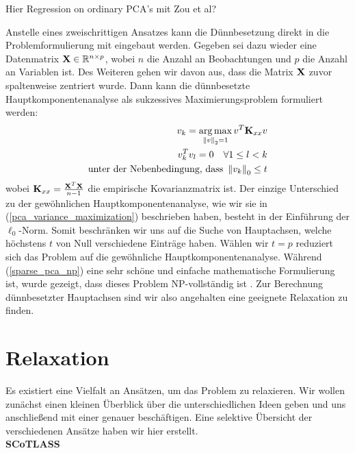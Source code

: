 Hier Regression on ordinary PCA's mit Zou et al?

Anstelle eines zweischrittigen Ansatzes kann die Dünnbesetzung direkt in die Problemformulierung mit eingebaut werden. Gegeben sei dazu wieder eine Datenmatrix $\mathbf{X} \in \mathbb{R}^{n \times p}$, wobei $n$ die Anzahl an Beobachtungen und $p$ die Anzahl an Variablen ist. Des Weiteren gehen wir davon aus, dass die Matrix $\mathbf{X}$ zuvor spaltenweise zentriert wurde. Dann kann die dünnbesetzte Hauptkomponentenanalyse als sukzessives Maximierungsproblem formuliert werden:
\begin{gather}
\label{sparse_pca_np}
\begin{split}
v_{k} = \operatorname*{arg\,max}_{\left\lVert v \right\rVert_2 = 1} v^{T}\mathbf{K}_{xx} v\\
v_{k}^Tv_{l} = 0 \quad \forall 1 \leq l < k\\
{\text{unter der Nebenbedingung, dass }} \left\lVert v_{k} \right\rVert_0 \leq t
\end{split}
\end{gather}
wobei $\mathbf{K}_{xx} = \frac{\mathbf{X}^T \mathbf{X}}{n-1}$ die empirische Kovarianzmatrix ist. Der einzige Unterschied zu der gewöhnlichen Hauptkomponentenanalyse, wie wir sie in (\ref{pca_variance_maximization}) beschrieben haben, besteht in der Einführung der $\ell_0$-Norm. Somit beschränken wir uns auf die Suche von Hauptachsen, welche höchstens $t$ von Null verschiedene Einträge haben. Wählen wir $t = p$ reduziert sich das Problem auf die gewöhnliche Hauptkomponentenanalyse. Während (\ref{sparse_pca_np}) eine sehr schöne und einfache mathematische Formulierung ist, wurde gezeigt, dass dieses Problem NP-vollständig ist \cite{foucart}. Zur Berechnung dünnbesetzter Hauptachsen sind wir also angehalten eine geeignete Relaxation zu finden.

\section{Relaxation}
\label{relaxation}

Es existiert eine Vielfalt an Ansätzen, um das Problem zu relaxieren. Wir wollen zunächst einen kleinen Überblick über die unterschiedlichen Ideen geben und uns anschließend mit einer genauer beschäftigen. Eine selektive Übersicht der verschiedenen Ansätze haben wir hier erstellt.\\

\textbf{SCoTLASS}


